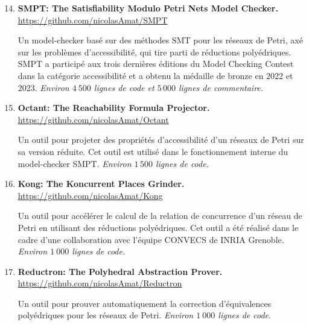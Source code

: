 \begin{enumerate}
  \setcounter{enumi}{13}
  \item \textbf{SMPT: The Satisfiability Modulo Petri Nets Model Checker.}\\
  \url{https://github.com/nicolasAmat/SMPT}
  \begin{mdframed}
  Un model-checker basé sur des méthodes SMT pour les réseaux de Petri, axé sur
  les problèmes d'accessibilité, qui tire parti de réductions polyédriques.
  \textsf{SMPT} a participé aux trois dernières éditions du Model Checking
  Contest dans la catégorie \og accessibilité \fg et a obtenu la médaille de bronze
  en 2022 et 2023.
  \smallbreak
  \emph{Environ $4\ 500$ lignes de code et $5\, 000$ lignes de commentaire.}
  \end{mdframed}

  \item \textbf{Octant: The Reachability Formula Projector.}\\
  \url{https://github.com/nicolasAmat/Octant}
    \begin{mdframed}
  Un outil pour projeter des propriétés d'accessibilité d'un réseaux de Petri
  sur sa version réduite. Cet outil est utilisé dans le fonctionnement interne
  du model-checker \textsf{SMPT}.
  \smallbreak
  \emph{Environ $1\,500$ lignes de code.}
    \end{mdframed}
  
  \item \textbf{Kong: The Koncurrent Places Grinder.}\\
  \url{https://github.com/nicolasAmat/Kong}
  \begin{mdframed}
  Un outil pour accélérer le calcul de la relation de concurrence d'un réseau de
  Petri en utilisant des réductions polyédriques. Cet outil a été réalisé dans
  le cadre d'une collaboration avec l'équipe CONVECS de INRIA Grenoble.
  \smallbreak
  \emph{Environ $1\ 000$ lignes de code.}
  \end{mdframed}
  \newpage

  \item \textbf{Reductron: The Polyhedral Abstraction Prover.}\\
  \url{https://github.com/nicolasAmat/Reductron}
  \begin{mdframed}
  Un outil pour prouver automatiquement la correction d'équivalences
  polyédriques pour les réseaux de Petri.
  \smallbreak
  \emph{Environ $1\ 000$ lignes de code.}
  \end{mdframed}
\end{enumerate}
\vspace{10pt}



